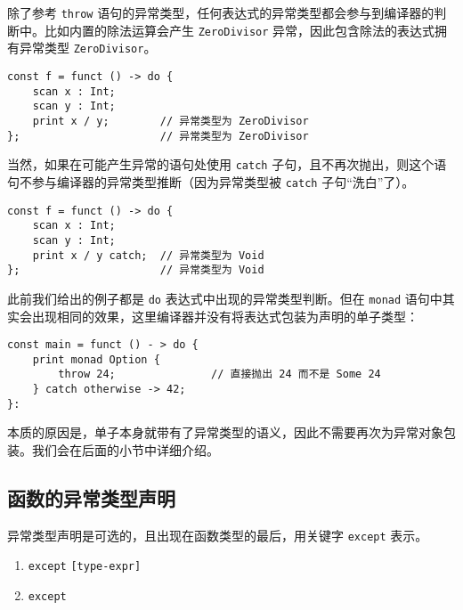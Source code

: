 除了参考 \lstinline!throw! 语句的异常类型，任何表达式的异常类型都会参与到编译器的判断中。比如内置的除法运算会产生 \lstinline!ZeroDivisor! 异常，因此包含除法的表达式拥有异常类型 \lstinline!ZeroDivisor!。

\begin{lstlisting}
const f = funct () -> do {
	scan x : Int;
	scan y : Int;
	print x / y;		// 异常类型为 ZeroDivisor
};						// 异常类型为 ZeroDivisor
\end{lstlisting}

当然，如果在可能产生异常的语句处使用 \lstinline!catch! 子句，且不再次抛出，则这个语句不参与编译器的异常类型推断（因为异常类型被 \lstinline!catch! 子句“洗白”了）。

\begin{lstlisting}
const f = funct () -> do {
	scan x : Int;
	scan y : Int;
	print x / y catch;	// 异常类型为 Void
};						// 异常类型为 Void
\end{lstlisting}

此前我们给出的例子都是 \lstinline!do! 表达式中出现的异常类型判断。但在 \lstinline!monad! 语句中其实会出现相同的效果，这里编译器并没有将表达式包装为声明的单子类型：

\begin{minipage}[c]{0.95\textwidth}
\vspace{1.0em}
\begin{lstlisting}
const main = funct () - > do {
    print monad Option {
    	throw 24;				// 直接抛出 24 而不是 Some 24
    } catch otherwise -> 42;
}:
\end{lstlisting}
\end{minipage}

本质的原因是，单子本身就带有了异常类型的语义，因此不需要再次为异常对象包装。我们会在后面的小节中详细介绍。

\subsection{函数的异常类型声明}

异常类型声明是可选的，且出现在函数类型的最后，用关键字 \lstinline!except! 表示。

\begin{grammar}[异常类型声明] \label{grm:exception-type-declaration}
\begin{enumerate}
	\item \lstinline!except! \texttt{[type-expr]}
	\item \lstinline!except!
\end{enumerate}
\end{grammar}

